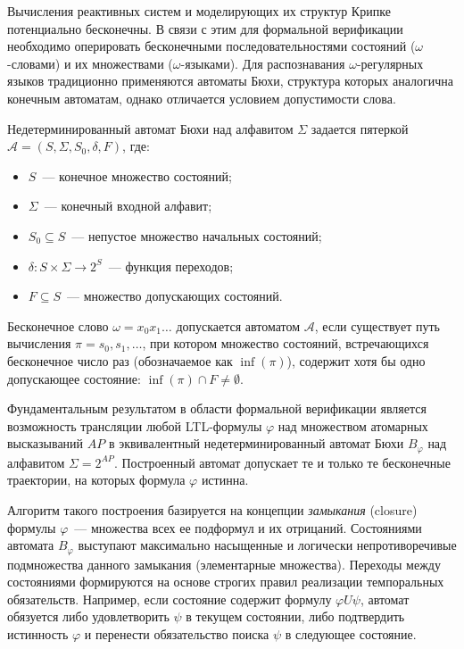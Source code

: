 Вычисления реактивных систем и моделирующих их структур Крипке потенциально бесконечны. В связи с этим для формальной верификации необходимо оперировать бесконечными последовательностями состояний ($\omega$-словами) и их множествами ($\omega$-языками). Для распознавания $\omega$-регулярных языков традиционно применяются автоматы Бюхи, структура которых аналогична конечным автоматам, однако отличается условием допустимости слова.

\begin{definition}\label{def:buchi}
    Недетерминированный автомат Бюхи над алфавитом $\Sigma$ задается пятеркой $\mathcal{A} = (S, \Sigma, S_0, \delta, F)$, где:
    \begin{itemize}
        \item $S$~--- конечное множество состояний;
        \item $\Sigma$~--- конечный входной алфавит;
        \item $S_0 \subseteq S$~--- непустое множество начальных состояний;
        \item $\delta \colon S \times \Sigma \to 2^S$~--- функция переходов;
        \item $F \subseteq S$~--- множество допускающих состояний.
    \end{itemize}
    Бесконечное слово $\omega = x_0 x_1 \dots$ допускается автоматом $\mathcal{A}$, если существует путь вычисления $\pi = s_0, s_1, \dots$, при котором множество состояний, встречающихся бесконечное число раз (обозначаемое как $\inf(\pi)$), содержит хотя бы одно допускающее состояние: $\inf(\pi) \cap F \neq \emptyset$.
\end{definition}

Фундаментальным результатом в области формальной верификации является возможность трансляции любой LTL-формулы $\varphi$ над множеством атомарных высказываний $AP$ в эквивалентный недетерминированный автомат Бюхи $B_\varphi$ над алфавитом $\Sigma = 2^{AP}$. Построенный автомат допускает те и только те бесконечные траектории, на которых формула $\varphi$ истинна.

Алгоритм такого построения базируется на концепции \textit{замыкания} (closure) формулы $\varphi$~--- множества всех ее подформул и их отрицаний. Состояниями автомата $B_\varphi$ выступают максимально насыщенные и логически непротиворечивые подмножества данного замыкания (элементарные множества). Переходы между состояниями формируются на основе строгих правил реализации темпоральных обязательств. Например, если состояние содержит формулу $\varphi U \psi$, автомат обязуется либо удовлетворить $\psi$ в текущем состоянии, либо подтвердить истинность $\varphi$ и перенести обязательство поиска $\psi$ в следующее состояние.

